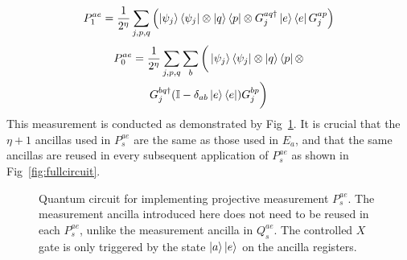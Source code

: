 \documentclass[aps,floatfix,10pt,amssymb,amsfont,amsmath,superscriptaddress,float,nofootinbib,longbibliography,nobalancelastpage,twocolumn]{revtex4-2}
\begin{document}
\begin{equation}
    P^{ae}_1 = \frac{1}{2^{\eta}}\sum_{j,p,q} \left( \ket{\psi_j}\bra{\psi_j} \otimes \ket{q}\bra{p} \otimes G_j^{aq\dagger}\ket{e}\bra{e}G_j^{ap} \right)
\end{equation}
\begin{multline}
    P^{ae}_0 = \frac{1}{2^{\eta}}\sum_{j,p,q} \sum_{b}\bigg( \ket{\psi_j}\bra{\psi_j} \otimes \ket{q}\bra{p} \otimes \\G_j^{bq\dagger}(\mathbb{I} - \delta_{ab}\ket{e}\bra{e})G_j^{bp}  \bigg)
\end{multline}
This measurement is conducted as demonstrated by Fig~\ref{fig:Pcircuit}. It is crucial that the $\eta + 1$ ancillas used in $P_s^{ae}$ are the same as those used in $E_a$, and that the same ancillas are reused in every subsequent application of $P_s^{ae}$ as shown in Fig~\ref{fig:fullcircuit}.
\begin{figure}

\caption{Quantum circuit for implementing projective measurement $P_s^{ae}$. The measurement ancilla introduced here does not need to be reused in each $P_s^{ae}$, unlike the measurement ancilla in $Q_s^{ae}$. The controlled $X$ gate is only triggered by the state $\ket{a}\ket{e}$ on the ancilla registers.}
\label{fig:Pcircuit}
\end{figure}
\end{document}

